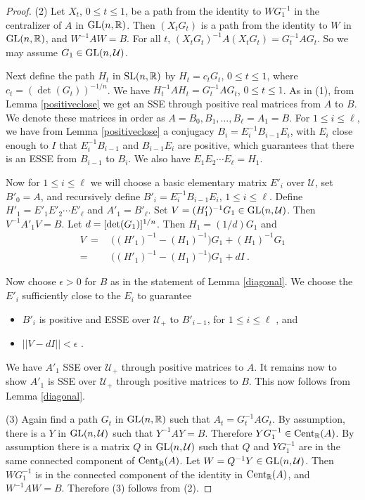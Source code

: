 \documentclass{amsart}
\theoremstyle{definition}
\theoremstyle{remark}
\numberwithin{equation}{section}
\begin{document}
{{\begin{proof}
(2) 
Let $X_t$, $0\leq t \leq 1$, be a path from the identity to $WG_1^{-1}$ 
in the centralizer of $A$ in 
$\textnormal{GL}(n, \mathbb R)$. Then $(X_tG_t)$ is a path from the identity 
to $W$ in $\textnormal{GL}(n, \mathbb R)$, and $W^{-1}AW=B$. 
For all $t$, $(X_tG_t)^{-1}A(X_tG_t)=G_t^{-1}AG_t $. 
So we may assume $G_1 
\in \textnormal{GL}(n, \mathcal U)$. 

Next define the path $H_t$ in $\textnormal{SL}(n,\mathbb R)$ by 
$H_t= c_tG_t$, $0\leq t\leq 1$, where $c_t=(\det (G_t))^{-1/n}$. 
We have  $H_t^{-1}AH_t=G_t^{-1}AG_t$, $0\leq t \leq 1$.  
As in (1), from 
Lemma \ref{positiveclose} we get an SSE through  
 positive real matrices from $A$ to $B$. We denote these  
matrices in order as   $A=B_0, B_1, \dots  , B_{\ell} =A_1=B$. 
For $1\leq i \leq \ell$, we have from 
Lemma \ref{positiveclose} a conjugacy 
$B_i = E_i^{-1}B_{i-1}E_i$, with $E_i$ close enough to $I$ 
that $ E_i^{-1}B_{i-1}$ and 
$B_{i-1}E_i$ are positive, which guarantees that there is 
an ESSE from $B_{i-1} $ to $B_i$. 
We also have $E_1E_2\cdots E_{\ell}=H_1$. 

Now for $1\leq i \leq \ell$ we will  choose a 
basic elementary matrix $E'_i$ over ${\mathcal U}$, set 
$B'_0=A$, and recursively 
define $B'_i = 
E_i^{-1}B_{i-1}E_i$, $1\leq i \leq \ell$. 
Define $H'_1 = E'_1E'_2\cdots E'_{\ell}$ and 
$A'_1= B'_{\ell}$.  
Set $V=(H'_1)^{-1}G_1\in\textnormal{GL}(n,\mathcal U)$. 
Then $V^{-1}A'_1V=B$. Let $d=[\textnormal{det}(G_1)]^{1/n}$. 
Then $H_1=(1/d)G_1$ and 
\begin{align*} 
V\ =\ & \Big((H'_1)^{-1}-(H_1)^{-1}\Big)G_1 + (H_1)^{-1}G_1 \\ 
=\ & \Big((H'_1)^{-1}-(H_1)^{-1}\Big)G_1 +dI \ . 
\end{align*} 

Now choose $\epsilon >0$ for $B$ as in the statement of 
Lemma \ref{diagonal}. 
We 
 choose the $E'_i$ sufficiently close to the $E_i$  
to guarantee 
\begin{itemize} 
\item 
$B'_i$ is positive and ESSE over $\mathcal U_+$ 
to $B'_{i-1}$, for $1\leq i \leq \ell$ , and  
\item 
$||V-dI||<\epsilon$ .  
\end{itemize}
We have $A'_1$ SSE over $\mathcal U_+$ through 
positive matrices to $A$. It remains now to 
show  
$A'_1$ is SSE over $\mathcal U_+$ through 
positive matrices to $B$. This now follows 
from Lemma \ref{diagonal}. 

(3) Again find a path $G_t$ in $\textnormal{GL}(n, \mathbb R)$ such that 
$A_t=G_t^{-1}AG_t$. By assumption, there is a $Y$ in $\textnormal{GL}(n, \mathcal U)$ 
such that $Y^{-1}AY=B$. Therefore $YG_1^{-1}\in 
\textnormal{Cent}_{\mathbb R} (A) $. By assumption 
 there is a matrix $Q$ 
in $\textnormal{GL}(n, \mathcal U)$ such that $Q$ and $YG_1^{-1}$ 
are in the same 
connected component of $ \textnormal{Cent}_{\mathbb R} (A) $. 
Let $W=Q^{-1}Y\in \textnormal{GL}(n,\mathcal U)$. 
Then $WG_1^{-1}$ is in the connected component 
of the identity in $ \textnormal{Cent}_{\mathbb R} (A) $, 
and $W^{-1}AW=B$. Therefore (3) follows from (2). 


\end{proof}}}
\end{document}
